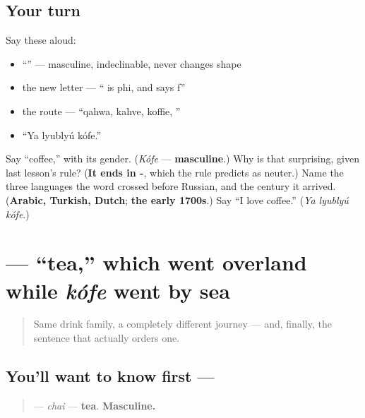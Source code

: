 \subsection*{Your turn}
Say these aloud:

\begin{itemize}
\raggedright
  \item \textquotedblleft{}\textquotedblright{} — masculine, indeclinable, never changes shape
  \item the new letter — \textquotedblleft{} is phi, and says f\textquotedblright{}
  \item the route — \textquotedblleft{}qahwa, kahve, koffie, \textquotedblright{}
  \item \textquotedblleft{}Ya lyublyú kófe.\textquotedblright{}
\end{itemize}

\begin{tcolorbox}[breakable,colback=teal!4,colframe=teal!35!black,title={Before you move on}]
Say \textquotedblleft{}coffee,\textquotedblright{} with its gender. (\emph{Kófe} — \textbf{masculine}.) Why is that surprising, given last lesson's rule? (\textbf{It ends in -}, which the rule predicts as neuter.) Name the three languages the word crossed before Russian, and the century it arrived. (\textbf{Arabic, Turkish, Dutch}; \textbf{the early 1700s}.) Say \textquotedblleft{}I love coffee.\textquotedblright{} (\emph{Ya lyublyú kófe}.)
\end{tcolorbox}
\section[\texorpdfstring{\ru{чай} (chai)}{чай (chai)}]{ — \textquotedblleft{}tea,\textquotedblright{} which went overland while \emph{kófe} went by sea}

\label{lesson:RU-C06-chai}



\begin{quote}
Same drink family, a completely different journey — and, finally, the sentence that actually orders one.
\end{quote}

\subsection*{You'll want to know first — }
\begin{quote}
\textbf{} — \emph{chai} — \textbf{tea}. \textbf{Masculine.}
\end{quote}

